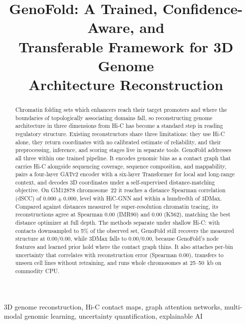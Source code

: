\documentclass[conference]{IEEEtran}
\providecommand{\gfdscc}{0.000}
\providecommand{\gfdsccstd}{0.000}
\providecommand{\gfcalib}{0.00}
\providecommand{\fishgeno}{0.00}
\providecommand{\fishgenok}{0.00}
\providecommand{\sparsegenoI}{0.00}
\providecommand{\sparsemaxI}{0.00}
\providecommand{\sparsegenoK}{0.00}
\providecommand{\sparsemaxK}{0.00}
\begin{document}
\title{GenoFold: A Trained, Confidence-Aware, and\\
Transferable Framework for 3D Genome\\
Architecture Reconstruction}

\author{
}

\maketitle

\begin{abstract}
Chromatin folding sets which enhancers reach their target promoters and where the
boundaries of topologically associating domains fall, so reconstructing genome
architecture in three dimensions from Hi-C has become a standard step in reading
regulatory structure. Existing reconstructors share three limitations: they use Hi-C
alone, they return coordinates with no calibrated estimate of reliability, and their
preprocessing, inference, and scoring stages live in separate tools. GenoFold addresses
all three within one trained pipeline. It encodes genomic bins as a contact graph that
carries Hi-C alongside sequencing coverage, sequence composition, and mappability, pairs
a four-layer GATv2 encoder with a six-layer Transformer for local and long-range context,
and decodes 3D coordinates under a self-supervised distance-matching objective. On GM12878
chromosome~22 it reaches a distance Spearman correlation (dSCC) of $\gfdscc\pm\gfdsccstd$,
level with HiC-GNN and within a hundredth of 3DMax. Compared against distances measured by
super-resolution chromatin tracing, its reconstructions agree at Spearman \fishgeno{}
(IMR90) and \fishgenok{} (K562), matching the best distance optimizer at full depth. The
methods separate under shallow Hi-C: with contacts downsampled to 5\% of the observed set,
GenoFold still recovers the measured structure at \sparsegenoI{}/\sparsegenoK{}, while
3DMax falls to \sparsemaxI{}/\sparsemaxK{}, because GenoFold's node features and learned
prior hold where the contact graph thins. It also attaches per-bin uncertainty that
correlates with reconstruction error (Spearman \gfcalib{}), transfers to unseen cell lines
without retraining, and runs whole chromosomes at 25--50~kb on commodity CPU.
\end{abstract}

\begin{IEEEkeywords}
3D genome reconstruction, Hi-C contact maps, graph attention networks,
multi-modal genomic learning, uncertainty quantification, explainable AI
\end{IEEEkeywords}
\end{document}
